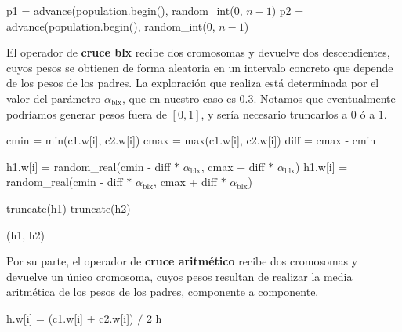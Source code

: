 \documentclass[12pt]{article}
\begin{document}
\begin{algorithm}[h!]
\begin{algorithmic}

    \State p1 = advance(population.begin(), random\_int($0$, $n-1$)  
    \State p2 = advance(population.begin(), random\_int($0$, $n-1$)
    \State {}
\EndFunction

\end{algorithmic}
\end{algorithm}

El operador de \textbf{cruce blx} recibe dos cromosomas y devuelve dos descendientes, cuyos pesos se obtienen de forma aleatoria en un intervalo concreto que depende de los pesos de los padres. La exploración que realiza está determinada por el valor del parámetro $\alpha_{\text{blx}}$, que en nuestro caso es $0.3$. Notamos que eventualmente podríamos generar pesos fuera de $[0,1]$, y sería necesario truncarlos a $0$ ó a $1$.

\begin{algorithm}[ht]
\begin{algorithmic}

      
        \State cmin = min(c1.w[i], c2.w[i])
        \State cmax = max(c1.w[i], c2.w[i])
        \State diff = cmax - cmin
        
        \State h1.w[i] = random\_real(cmin - diff $\ast$ $\alpha_{\text{blx}}$, cmax + diff $\ast$ $\alpha_{\text{blx}}$)
        \State h1.w[i] = random\_real(cmin - diff $\ast$ $\alpha_{\text{blx}}$, cmax + diff $\ast$ $\alpha_{\text{blx}}$)
        
        \State truncate(h1)
        \State truncate(h2)
    \EndFor
    
    \State \Return (h1, h2)
\EndFunction

\end{algorithmic}
\end{algorithm}

Por su parte, el operador de \textbf{cruce aritmético} recibe dos cromosomas y devuelve un único cromosoma, cuyos pesos resultan de realizar la media aritmética de los pesos de los padres, componente a componente.\\

\begin{algorithm}[ht!]
\begin{algorithmic}

      
        \State h.w[i] = (c1.w[i] + c2.w[i]) $/$ 2
    \EndFor
    \State \Return h
\EndFunction

\end{algorithmic}
\end{algorithm}
\end{document}
